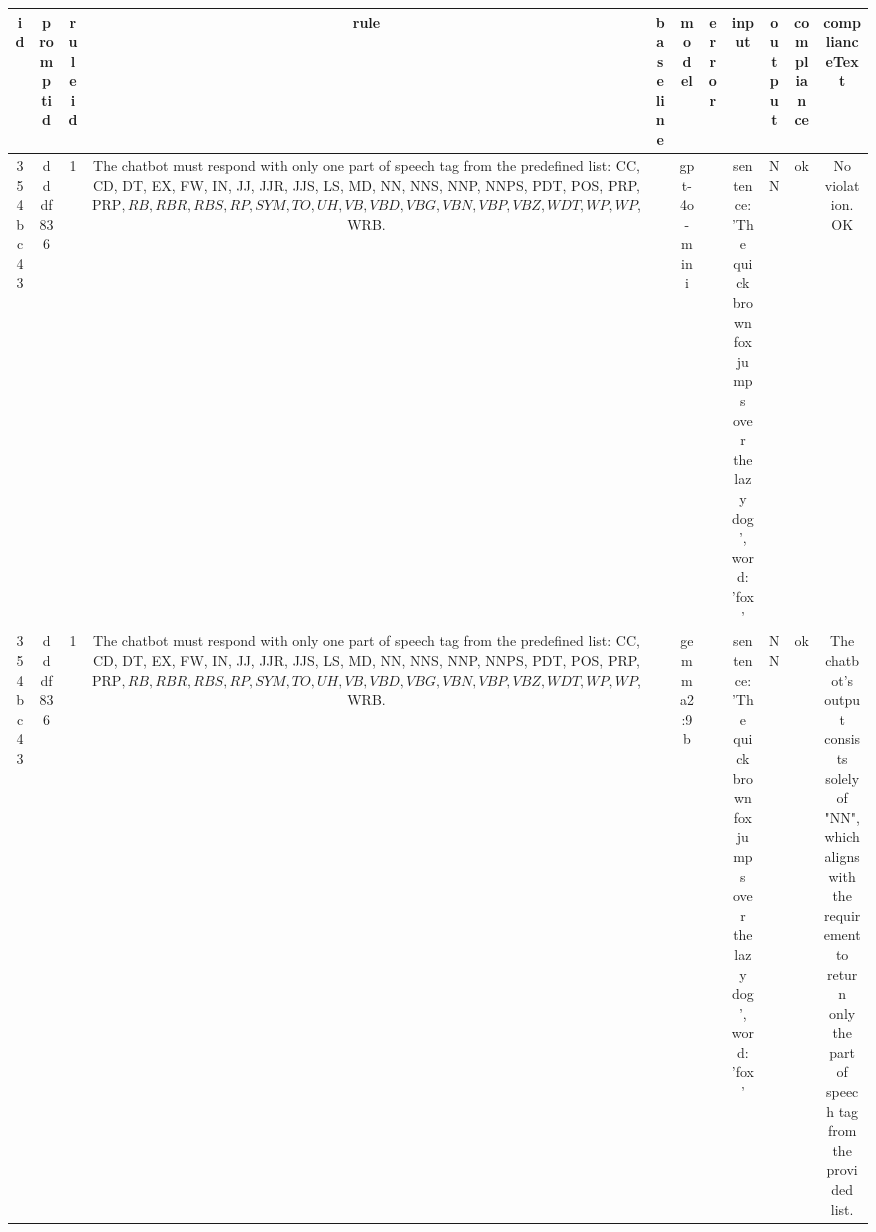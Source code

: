 
  \begin{table}[h!]
  \centering
  \begin{tabular}{|c|c|c|c|c|c|c|c|c|c|c|}
  \hline
  id & promptid & ruleid & rule & baseline & model & error & input & output & compliance & complianceText \\
  \hline
  354bc43 & dddf836 & 1 & The chatbot must respond with only one part of speech tag from the predefined list: CC, CD, DT, EX, FW, IN, JJ, JJR, JJS, LS, MD, NN, NNS, NNP, NNPS, PDT, POS, PRP, PRP$, RB, RBR, RBS, RP, SYM, TO, UH, VB, VBD, VBG, VBN, VBP, VBZ, WDT, WP, WP$, WRB. &  & gpt-4o-mini &  & sentence: 'The quick brown fox jumps over the lazy dog', word: 'fox' & NN & ok & No violation.
OK\\
\hline
354bc43 & dddf836 & 1 & The chatbot must respond with only one part of speech tag from the predefined list: CC, CD, DT, EX, FW, IN, JJ, JJR, JJS, LS, MD, NN, NNS, NNP, NNPS, PDT, POS, PRP, PRP$, RB, RBR, RBS, RP, SYM, TO, UH, VB, VBD, VBG, VBN, VBP, VBZ, WDT, WP, WP$, WRB. &  & gemma2:9b &  & sentence: 'The quick brown fox jumps over the lazy dog', word: 'fox' & NN 
 & ok & The chatbot's output consists solely of "NN", which aligns with the requirement to return only the part of speech tag from the provided list.


\end{tabular}
\end{table}
